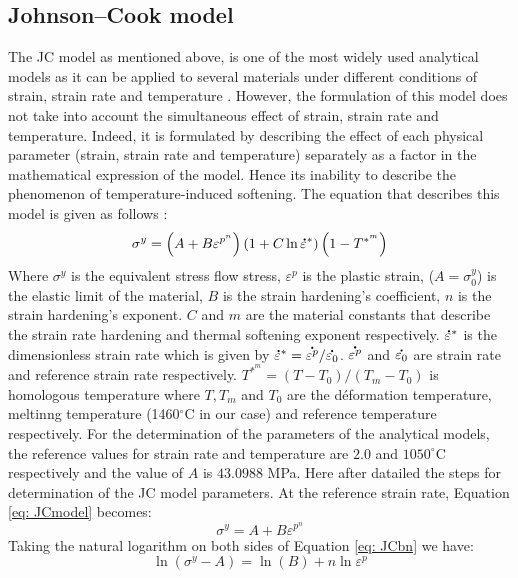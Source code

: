 \documentclass[twoside,english,1p,final,sort&compress]{elsarticle}
\theoremstyle{plain}
\newcommand{\mdot}[1]{\accentset{\mbox{\bfseries .}}{#1}}
\begin{document}
\subsection{Johnson--Cook model\label{sec:JC}}
The JC model as mentioned above, is one of the most widely used analytical models as it can be applied to several materials under different conditions of strain, strain rate and temperature . However, the formulation of this model does not take into account the simultaneous effect of strain, strain rate and temperature. Indeed, it is formulated by describing the effect of each physical parameter (strain, strain rate and temperature) separately as a factor in the mathematical expression of the model. Hence its inability to describe the phenomenon of temperature-induced softening. The equation that describes this model is given as follows \cite{johnson1985fracture}:
\begin{equation}
\label{eq: JCmodel}
\sigma^y = \left(A + B\varepsilon^{p^n}\right)\left(1+C\ln\mdot{\varepsilon}^*\right)\left(1-T^{*^m}\right)
\end{equation}
Where $\sigma^y$ is the equivalent stress flow stress, $\varepsilon^p$ is the plastic strain, ($A=\sigma^y_0$) is the elastic limit of the material, $B$ is the strain hardening's coefficient, $n$ is the strain hardening's exponent. $C$ and $m$ are the material constants that describe the strain rate hardening and thermal softening exponent respectively. $\mdot{\varepsilon}^*$ is the dimensionless strain rate which is given by $\mdot{\varepsilon}^* = \mdot{\varepsilon^p}/\mdot{\varepsilon_0}$. $\mdot{\varepsilon^p}$ and $\mdot{\varepsilon_0}$ are strain rate and reference strain rate respectively. $T^{*^m} = (T-T_0)/(T_m - T_0)$ is homologous temperature where $T, T_m$ and $T_0$ are the déformation temperature, meltinng temperature (1460$^\circ$C in our case) and reference temperature respectively. For the determination of the parameters of the analytical models, the reference values for strain rate and temperature are $2.0$ and $1050^\circ$C respectively and the value of $A$ is $43.0988$ MPa. Here after datailed the steps for determination of the JC model parameters.
At the reference strain rate, Equation \ref{eq: JCmodel} becomes:
\begin{equation}
\label{eq: JCbn}
\sigma^y = A + B\varepsilon^{p^n}
\end{equation}
Taking the natural logarithm on both sides of Equation \ref{eq: JCbn} we have:
\begin{equation}
\label{eq:JClog1}
\ln\left(\sigma^y-A\right)= \ln(B) + n\ln\varepsilon^p
\end{equation}
\end{document}

